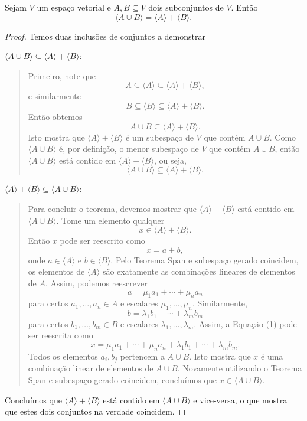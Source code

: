 \begin{theorem}
	Sejam $V$ um espaço vetorial e $A,B\subseteq V$ dois subconjuntos de $V$. Então
	\[\langle A\cup B\rangle=\langle A\rangle+\langle B\rangle.\]
\end{theorem}

\begin{proof}
	Temos duas inclusões de conjuntos a demonstrar
	
	$\langle A\cup B\rangle\subseteq\langle A\rangle+\langle B\rangle$:
	
	\begin{quote}
	Primeiro, note que
	\[A\subseteq\langle A\rangle\subseteq\langle A\rangle+\langle B\rangle,\]
	e similarmente
	\[B\subseteq\langle B\rangle\subseteq\langle A\rangle+\langle B\rangle.\]
	Então obtemos
	\[A\cup B\subseteq\langle A\rangle+\langle B\rangle.\]
	Isto mostra que $\langle A\rangle+\langle B\rangle$ é um subespaço de $V$ que contém $A\cup B$. Como $\langle A\cup B\rangle$ é, por definição, o menor subespaço de $V$ que contém $A\cup B$, então $\langle A\cup B\rangle$ está contido em $\langle A\rangle+\langle B\rangle$, ou seja,
	\[\langle A\cup B\rangle\subseteq\langle A\rangle+\langle B\rangle.\]
	\end{quote}
	
	$\langle A\rangle+\langle B\rangle\subseteq\langle A\cup B\rangle$:
	
	\begin{quote}
	Para concluir o teorema, devemos mostrar que $\langle A\rangle+\langle B\rangle$ está contido em $\langle A\cup B\rangle$. Tome um elemento qualquer
	\[x\in\langle A\rangle+\langle B\rangle.\]
	Então $x$ pode ser reescrito como
	\[x=a+b,\tag{1}\]
	onde $a\in\langle A\rangle$ e $b\in\langle B\rangle$. Pelo Teorema Span e subespaço gerado coincidem, os elementos de $\langle A\rangle$ são exatamente as combinações lineares de elementos de $A$. Assim, podemos reescrever
	\[a=\mu_1a_1+\cdots+\mu_na_n\]
	para certos $a_1,\ldots,a_n\in A$ e escalares $\mu_1,\ldots,\mu_n$. Similarmente,
	\[b=\lambda_1b_1+\cdots+\lambda_m b_m\]
	para certos $b_1,\ldots,b_m\in B$ e escalares $\lambda_1,\ldots,\lambda_m$. Assim, a Equação (1) pode ser reescrita como
	\[x=\mu_1a_1+\cdots+\mu_na_n+\lambda_1b_1+\cdots+\lambda_mb_m.\]
	Todos os elementos $a_i,b_j$ pertencem a $A\cup B$. Isto mostra que $x$ é uma combinação linear de elementos de $A\cup B$. Novamente utilizando o Teorema Span e subespaço gerado coincidem, concluímos que $x\in\langle A\cup B\rangle$.
	\end{quote}
	
	Concluímos que $\langle A\rangle+\langle B\rangle$ está contido em $\langle A\cup B\rangle$ e vice-versa, o que mostra que estes dois conjuntos na verdade coincidem.
\end{proof}